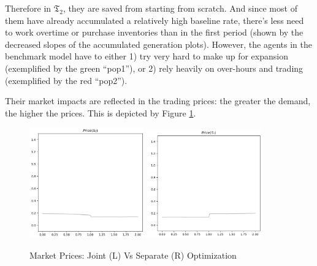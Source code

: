 \documentclass[a4paper,10pt]{article}
\newcommand{\1}{\mathbf{1}}
\begin{document}

Therefore in \textbf{\(\mathfrak{T}_2\)}, they are saved from starting from scratch. And since most of them have already accumulated a relatively high baseline rate, there's less need to work overtime or purchase inventories than in the first period (shown by the decreased slopes of the accumulated generation plots). However, the agents in the benchmark model have to either 1) try very hard to make up for expansion (exemplified by the green ``pop1''), or 2) rely heavily on over-hours and trading (exemplified by the red ``pop2'').

Their market impacts are reflected in the trading prices: the greater the demand, the higher the prices. This is depicted by Figure \ref{fig:price}.

\begin{center}
\begin{figure}[ht]
    \centering
    \includegraphics[width=0.44\textwidth]{FinalReports/Illustration_diagrams/Joint-2A2P-Sigmoid-ResExamples/Price.png}
    \hspace{1pt}
    \includegraphics[width=0.44\textwidth]{FinalReports/Illustration_diagrams/Seprt-2A2P-Sigmoid-ResExamples/Price.png}\\
    \caption{Market Prices: Joint (L) Vs Separate (R) Optimization}
    \label{fig:price}
\end{figure}
\end{center}
\end{document}
